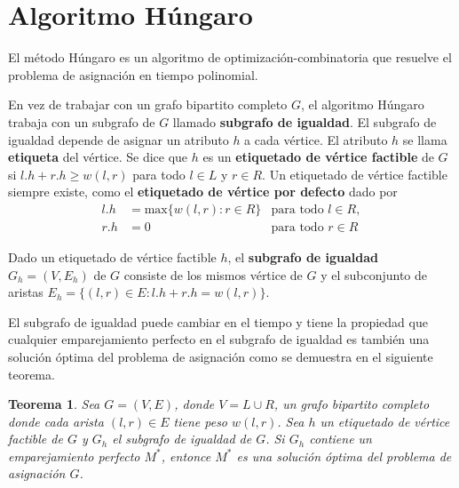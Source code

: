 \documentclass[10pt]{article} %
\newtheorem{thm}{Teorema}
\begin{document}
	\section{Algoritmo H\'ungaro}

	El método Húngaro es un algoritmo de optimización-combinatoria que resuelve el problema de asignación en tiempo polinomial.
	
	En vez de trabajar con un grafo bipartito completo $G$, el algoritmo H\'ungaro trabaja con un subgrafo de $G$ llamado \textbf{subgrafo de igualdad}. El subgrafo de igualdad depende de asignar un atributo $h$ a cada v\'ertice. El atributo $h$ se llama \textbf{etiqueta} del v\'ertice. Se dice que $h$ es un \textbf{etiquetado de vértice factible} de $G$ si $l.h + r.h \geq w(l,r)$ para todo $l \in L$ y $r \in R$. Un etiquetado de v\'ertice factible siempre existe, como el \textbf{etiquetado de v\'ertice por defecto} dado por
	\begin{align}
		\label{eq:defecto}
		l.h &= \text{max} \{w(l,r):r \in R\} &\text{para todo } l \in R,\\
		r.h &= 0 &\text{para todo } r \in R 
	\end{align}
	
	Dado un etiquetado de v\'ertice factible $h$, el \textbf{subgrafo de igualdad} $G_h = (V, E_h)$ de $G$ consiste de los mismos v\'ertice de $G$ y el subconjunto de aristas $E_h = \{(l,r) \in E: l.h + r.h = w(l,r)\}$.
	
	El subgrafo de igualdad puede cambiar en el tiempo y tiene la propiedad que cualquier emparejamiento perfecto en el subgrafo de igualdad es tambi\'en una soluci\'on \'optima del problema de asignaci\'on como se demuestra en el siguiente teorema.
	\begin{thm} \cite{introduction}
		\label{thm: emparejamiento}
		Sea $G=(V,E)$, donde $V = L \cup R$, un grafo bipartito completo donde cada arista $(l,r) \in E$ tiene peso $w(l,r)$. Sea $h$ un etiquetado de v\'ertice factible de $G$ y $G_h$ el subgrafo de igualdad de $G$. Si $G_h$ contiene un emparejamiento perfecto $M^*$, entonce $M^*$ es una soluci\'on \'optima del problema de asignaci\'on $G$. 
		
	\end{thm}
	
\end{document}
